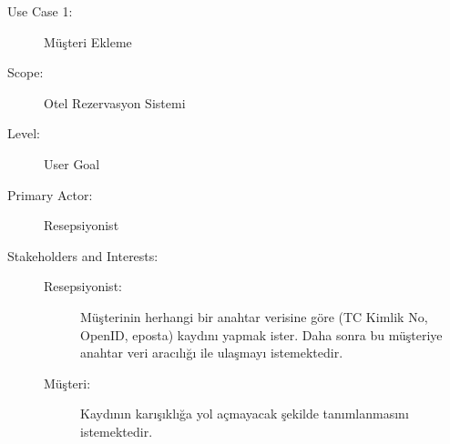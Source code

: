 \documentclass[12pt,a4paper]{report}
\begin{document}
\newpage

\begin{description}
\item[Use Case 1:] Müşteri Ekleme \\
\item[Scope:] Otel Rezervasyon Sistemi
\item[Level:] User Goal
\item[Primary Actor:] Resepsiyonist \\
\item[Stakeholders and Interests:]
\begin{description}
\item[Resepsiyonist:] Müşterinin herhangi bir anahtar verisine göre 
(TC Kimlik No, OpenID, eposta) kaydını yapmak ister. Daha sonra bu 
müşteriye anahtar veri aracılığı ile ulaşmayı istemektedir.
\item[Müşteri:] Kaydının karışıklığa yol açmayacak şekilde tanımlanmasını istemektedir.
\end{description}
\end{description}
\end{document}
